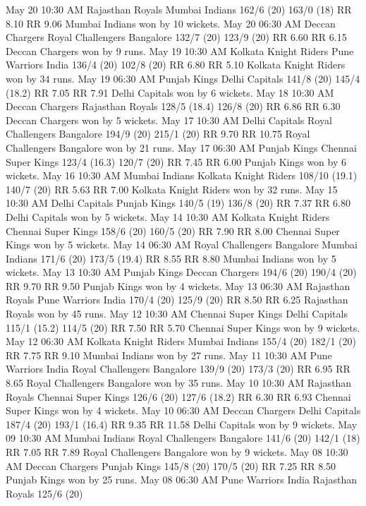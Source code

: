 May 20
10:30 AM
Rajasthan Royals
Mumbai Indians
162/6 (20)
163/0 (18)
RR 8.10
RR 9.06
Mumbai Indians won by 10 wickets.
May 20
06:30 AM
Deccan Chargers
Royal Challengers Bangalore
132/7 (20)
123/9 (20)
RR 6.60
RR 6.15
Deccan Chargers won by 9 runs.
May 19
10:30 AM
Kolkata Knight Riders
Pune Warriors India
136/4 (20)
102/8 (20)
RR 6.80
RR 5.10
Kolkata Knight Riders won by 34 runs.
May 19
06:30 AM
Punjab Kings
Delhi Capitals
141/8 (20)
145/4 (18.2)
RR 7.05
RR 7.91
Delhi Capitals won by 6 wickets.
May 18
10:30 AM
Deccan Chargers
Rajasthan Royals
128/5 (18.4)
126/8 (20)
RR 6.86
RR 6.30
Deccan Chargers won by 5 wickets.
May 17
10:30 AM
Delhi Capitals
Royal Challengers Bangalore
194/9 (20)
215/1 (20)
RR 9.70
RR 10.75
Royal Challengers Bangalore won by 21 runs.
May 17
06:30 AM
Punjab Kings
Chennai Super Kings
123/4 (16.3)
120/7 (20)
RR 7.45
RR 6.00
Punjab Kings won by 6 wickets.
May 16
10:30 AM
Mumbai Indians
Kolkata Knight Riders
108/10 (19.1)
140/7 (20)
RR 5.63
RR 7.00
Kolkata Knight Riders won by 32 runs.
May 15
10:30 AM
Delhi Capitals
Punjab Kings
140/5 (19)
136/8 (20)
RR 7.37
RR 6.80
Delhi Capitals won by 5 wickets.
May 14
10:30 AM
Kolkata Knight Riders
Chennai Super Kings
158/6 (20)
160/5 (20)
RR 7.90
RR 8.00
Chennai Super Kings won by 5 wickets.
May 14
06:30 AM
Royal Challengers Bangalore
Mumbai Indians
171/6 (20)
173/5 (19.4)
RR 8.55
RR 8.80
Mumbai Indians won by 5 wickets.
May 13
10:30 AM
Punjab Kings
Deccan Chargers
194/6 (20)
190/4 (20)
RR 9.70
RR 9.50
Punjab Kings won by 4 wickets.
May 13
06:30 AM
Rajasthan Royals
Pune Warriors India
170/4 (20)
125/9 (20)
RR 8.50
RR 6.25
Rajasthan Royals won by 45 runs.
May 12
10:30 AM
Chennai Super Kings
Delhi Capitals
115/1 (15.2)
114/5 (20)
RR 7.50
RR 5.70
Chennai Super Kings won by 9 wickets.
May 12
06:30 AM
Kolkata Knight Riders
Mumbai Indians
155/4 (20)
182/1 (20)
RR 7.75
RR 9.10
Mumbai Indians won by 27 runs.
May 11
10:30 AM
Pune Warriors India
Royal Challengers Bangalore
139/9 (20)
173/3 (20)
RR 6.95
RR 8.65
Royal Challengers Bangalore won by 35 runs.
May 10
10:30 AM
Rajasthan Royals
Chennai Super Kings
126/6 (20)
127/6 (18.2)
RR 6.30
RR 6.93
Chennai Super Kings won by 4 wickets.
May 10
06:30 AM
Deccan Chargers
Delhi Capitals
187/4 (20)
193/1 (16.4)
RR 9.35
RR 11.58
Delhi Capitals won by 9 wickets.
May 09
10:30 AM
Mumbai Indians
Royal Challengers Bangalore
141/6 (20)
142/1 (18)
RR 7.05
RR 7.89
Royal Challengers Bangalore won by 9 wickets.
May 08
10:30 AM
Deccan Chargers
Punjab Kings
145/8 (20)
170/5 (20)
RR 7.25
RR 8.50
Punjab Kings won by 25 runs.
May 08
06:30 AM
Pune Warriors India
Rajasthan Royals
125/6 (20)
